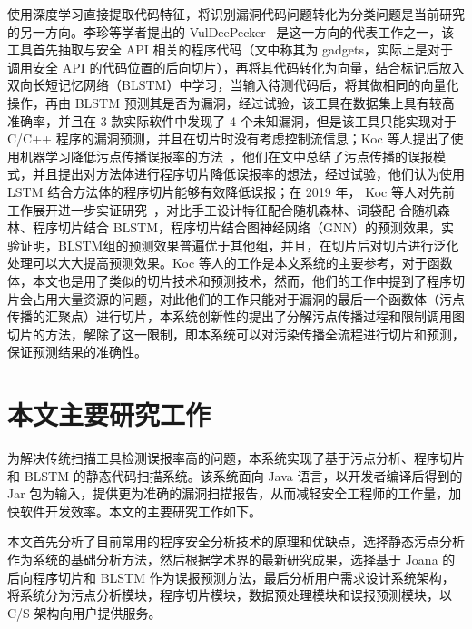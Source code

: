 使用深度学习直接提取代码特征，将识别漏洞代码问题转化为分类问题是当前研究的另一方向。李珍等学者提出的 VulDeePecker~\cite{vuldeepecker} 是这一方向的代表工作之一，该工具首先抽取与安全 API 相关的程序代码（文中称其为 gadgets，实际上是对于调用安全 API 的代码位置的后向切片），再将其代码转化为向量，结合标记后放入双向长短记忆网络（BLSTM）中学习，当输入待测代码后，将其做相同的向量化操作，再由 BLSTM 预测其是否为漏洞，经过试验，该工具在数据集上具有较高准确率，并且在 3 款实际软件中发现了 4 个未知漏洞，但是该工具只能实现对于 C/C++ 程序的漏洞预测，并且在切片时没有考虑控制流信息；Koc 等人提出了使用机器学习降低污点传播误报率的方法~\cite{Koc2017}，他们在文中总结了污点传播的误报模式，并且提出对方法体进行程序切片降低误报率的想法，经过试验，他们认为使用 LSTM 结合方法体的程序切片能够有效降低误报；在 2019 年， Koc 等人对先前工作展开进一步实证研究~\cite{Koc2019}，对比手工设计特征配合随机森林、词袋配 合随机森林、程序切片结合 BLSTM，程序切片结合图神经网络（GNN）的预测效果，实验证明，BLSTM组的预测效果普遍优于其他组，并且，在切片后对切片进行泛化处理可以大大提高预测效果。Koc 等人的工作是本文系统的主要参考，对于函数体，本文也是用了类似的切片技术和预测技术，然而，他们的工作中提到了程序切片会占用大量资源的问题，对此他们的工作只能对于漏洞的最后一个函数体（污点传播的汇聚点）进行切片，本系统创新性的提出了分解污点传播过程和限制调用图切片的方法，解除了这一限制，即本系统可以对污染传播全流程进行切片和预测，保证预测结果的准确性。



\section{本文主要研究工作}
为解决传统扫描工具检测误报率高的问题，本系统实现了基于污点分析、程序切片和 BLSTM 的静态代码扫描系统。该系统面向 Java 语言，以开发者编译后得到的 Jar 包为输入，提供更为准确的漏洞扫描报告，从而减轻安全工程师的工作量，加快软件开发效率。本文的主要研究工作如下。

本文首先分析了目前常用的程序安全分析技术的原理和优缺点，选择静态污点分析作为系统的基础分析方法，然后根据学术界的最新研究成果，选择基于 Joana 的后向程序切片和 BLSTM 作为误报预测方法，最后分析用户需求设计系统架构，将系统分为污点分析模块，程序切片模块，数据预处理模块和误报预测模块，以 C/S 架构向用户提供服务。

